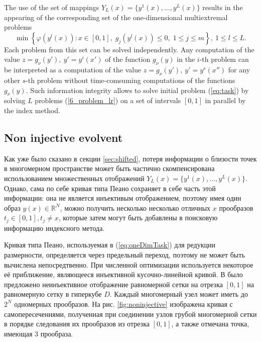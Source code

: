 \documentclass[runningheads]{llncs}
\begin{document}
The use of the set of mappings $Y_L(x)=\{y^1(x),...,y^L(x)\}$ results in the appearing of the corresponding set of the one-dimensional multiextremal problems
\begin{equation}\label{6_problem_lr}
  \min{\left\{\varphi(y^l(x)):x\in [0,1], \; g_j(y^l(x))\leq 0, \; 1 \leq j \leq m\right\}}, \ 1 \leq l \leq L.
\end{equation}
Each problem from this set can be solved independently. Any computation of the value $z=g_\nu(y'),\ y'=y^i(x')$ of the function $g_\nu(y)$ in the $i$-th problem can be interpreted as a computation of the value $z=g_\nu(y'),\ y'=y^s(x'')$ for any other $s$-th problem without time-comsuming computations of the functions $g_\nu(y)$. Such information integrity allows to solve  initial problem (\ref{eq:task}) by solving $L$ problems (\ref{6_problem_lr}) on a set of intervals $[0,1]$ in parallel by the index method.

\subsection{Non injective evolvent}

Как уже было сказано в секции \ref{sec:shifted}, потеря информации о близости точек в многомерном пространстве может быть частично скомпенсирована использованием множественных отображений $Y_L(x)=\{y^1(x),...,y^L(x)\}$. Однако, сама по себе кривая типа Пеано сохраняет в себе часть этой информации: она не является инъективым отображением, поэтому имея один образ $y(x)\in \mathbb{R}^N$, можно получить несколько несколько отличных $x$ прообразов $t_j\in[0,1], t_j \not = x$, которые затем могут быть добавлены в поисковую информацию индексного метода.

Кривая типа Пеано, используемая в (\ref{eq:oneDimTask}) для редукции размерности, определяется через предельный переход,
поэтому не может быть вычислена непосредтвенно. При численной оптимизации используется некоторое её приближение, являющееся
инъективной кусочно-линейной кривой. В \cite{strongin1978} было предложено неинъективное отображение равномерной сетки на отрезка $[0,1]$ на равномерную сетку в гиперкубе $D$. Каждый многомерный узел может иметь до $2^N$ одномерных прообразов. На рис. \ref{fig:noninjective} изображена кривая с самопересечениями, полученная при соединении узлов грубой многомерной сетки в порядке следования их прообразов из отрезка $[0,1]$, а также отмечана точка, имеющая 3 прообраза.
\end{document}
